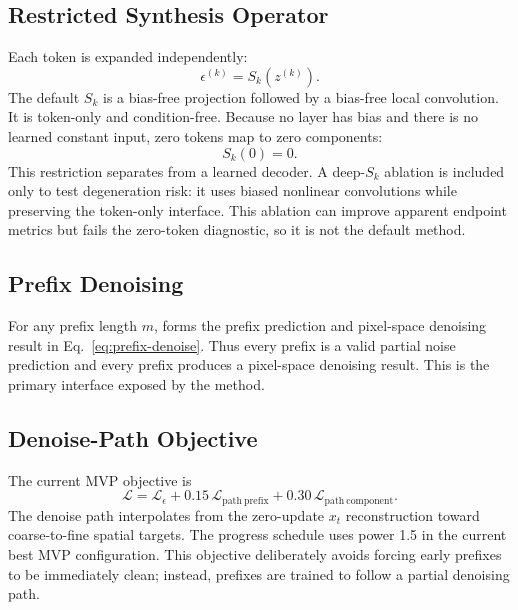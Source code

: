 \subsection{Restricted Synthesis Operator}

Each token is expanded independently:
\begin{equation}
  \epsilon^{(k)} = S_k\left(z^{(k)}\right).
\end{equation}
The default $S_k$ is a bias-free projection followed by a bias-free local
convolution. It is token-only and condition-free. Because no layer has bias and
there is no learned constant input, zero tokens map to zero components:
\begin{equation}
  S_k(0)=0.
\end{equation}
This restriction separates \method{} from a learned decoder. A deep-$S_k$
ablation is included only to test degeneration risk: it uses biased nonlinear
convolutions while preserving the token-only interface. This ablation can
improve apparent endpoint metrics but fails the zero-token diagnostic, so it is
not the default method.

\subsection{Prefix Denoising}

For any prefix length $m$, \method{} forms the prefix prediction and pixel-space
denoising result in Eq.~\ref{eq:prefix-denoise}. Thus every prefix is a valid
partial noise prediction and every prefix produces a pixel-space denoising
result. This is the primary interface exposed by the method.

\subsection{Denoise-Path Objective}

The current MVP objective is
\begin{equation}
  \mathcal{L}
  =
  \mathcal{L}_{\epsilon}
  + 0.15\,\mathcal{L}_{\mathrm{path\ prefix}}
  + 0.30\,\mathcal{L}_{\mathrm{path\ component}}.
\end{equation}
The denoise path interpolates from the zero-update $x_t$ reconstruction toward
coarse-to-fine spatial targets. The progress schedule uses power 1.5 in the
current best MVP configuration. This objective deliberately avoids forcing early
prefixes to be immediately clean; instead, prefixes are trained to follow a
partial denoising path.

